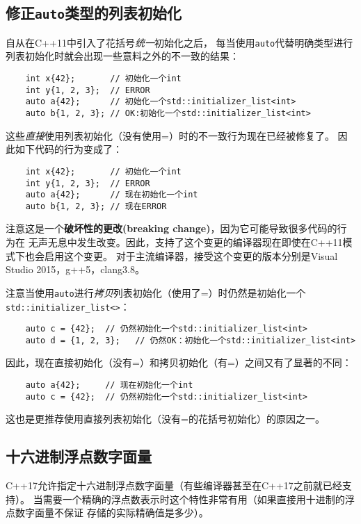 \subsection{修正\texttt{auto}类型的列表初始化}\label{ch8.4}
自从在C++11中引入了花括号\emph{统一}初始化之后，
每当使用\texttt{auto}代替明确类型进行列表初始化时就会出现一些意料之外的不一致的结果：
\begin{lstlisting}
    int x{42};       // 初始化一个int
    int y{1, 2, 3};  // ERROR
    auto a{42};      // 初始化一个std::initializer_list<int>
    auto b{1, 2, 3}; // OK:初始化一个std::initializer_list<int>
\end{lstlisting}
这些\emph{直接}使用列表初始化（没有使用=）时的不一致行为现在已经被修复了。
因此如下代码的行为变成了：
\begin{lstlisting}
    int x{42};       // 初始化一个int
    int y{1, 2, 3};  // ERROR
    auto a{42};      // 现在初始化一个int
    auto b{1, 2, 3}; // 现在ERROR
\end{lstlisting}
注意这是一个\textbf{破坏性的更改(breaking change)}，因为它可能导致很多代码的行为在
无声无息中发生改变。因此，支持了这个变更的编译器现在即使在C++11模式下也会启用这个变更。
对于主流编译器，接受这个变更的版本分别是Visual Studio 2015，g++5，clang3.8。

注意当使用\texttt{auto}进行\emph{拷贝}列表初始化（使用了=）时仍然是初始化一个
\texttt{std::initializer\_list<>}：
\begin{lstlisting}
    auto c = {42};  // 仍然初始化一个std::initializer_list<int>
    auto d = {1, 2, 3};   // 仍然OK：初始化一个std::initializer_list<int>
\end{lstlisting}
因此，现在直接初始化（没有=）和拷贝初始化（有=）之间又有了显著的不同：
\begin{lstlisting}
    auto a{42};     // 现在初始化一个int
    auto c = {42};  // 仍然初始化一个std::initializer_list<int>
\end{lstlisting}
这也是更推荐使用直接列表初始化（没有=的花括号初始化）的原因之一。

\subsection{十六进制浮点数字面量}\label{ch8.5}
C++17允许指定十六进制浮点数字面量（有些编译器甚至在C++17之前就已经支持）。
当需要一个精确的浮点数表示时这个特性非常有用（如果直接用十进制的浮点数字面量不保证
存储的实际精确值是多少）。

